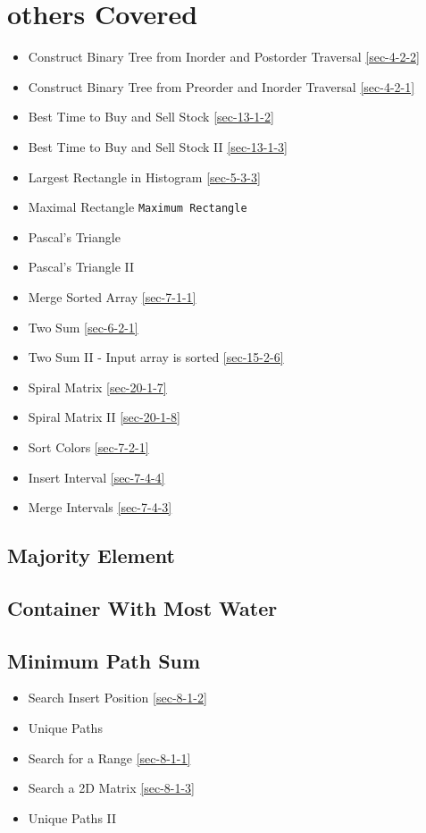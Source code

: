 \documentclass[12pt]{book}
\begin{document}
\section{others Covered}
\label{sec-1-4}
\begin{itemize}
\item Construct Binary Tree from Inorder and Postorder Traversal
\ref{sec-4-2-2}
\item Construct Binary Tree from Preorder and Inorder Traversal
\ref{sec-4-2-1}
\item Best Time to Buy and Sell Stock
\ref{sec-13-1-2}
\item Best Time to Buy and Sell Stock II        
\ref{sec-13-1-3}
\item Largest Rectangle in Histogram
\ref{sec-5-3-3}
\item Maximal Rectangle
\texttt{Maximum Rectangle}
\item Pascal's Triangle
\item Pascal's Triangle II
\item Merge Sorted Array        
\ref{sec-7-1-1}
\item Two Sum
\ref{sec-6-2-1}
\item Two Sum II - Input array is sorted
\ref{sec-15-2-6}
\item Spiral Matrix
\ref{sec-20-1-7}
\item Spiral Matrix II
\ref{sec-20-1-8}
\item Sort Colors
\ref{sec-7-2-1}
\item Insert Interval
\ref{sec-7-4-4}
\item Merge Intervals
\ref{sec-7-4-3}
\end{itemize}
\subsection{Majority Element}
\label{sec-1-4-1}
\subsection{Container With Most Water}
\label{sec-1-4-2}
\subsection{Minimum Path Sum}
\label{sec-1-4-3}
\begin{itemize}
\item Search Insert Position
\ref{sec-8-1-2}
\item Unique Paths
\item Search for a Range
\ref{sec-8-1-1}
\item Search a 2D Matrix
\ref{sec-8-1-3}
\item Unique Paths II
\end{itemize}
\end{document}
